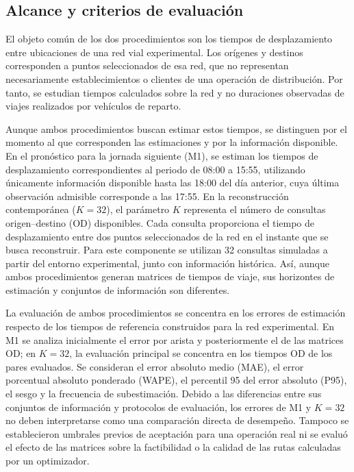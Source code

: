 \documentclass[letterpaper,11pt]{article}
\begin{document}
\subsection{Alcance y criterios de evaluación}\label{sec:alcance}

El objeto común de los dos procedimientos son los tiempos de desplazamiento entre ubicaciones de una red vial experimental. Los orígenes y destinos corresponden a puntos seleccionados de esa red, que no representan necesariamente establecimientos o clientes de una operación de distribución. Por tanto, se estudian tiempos calculados sobre la red y no duraciones observadas de viajes realizados por vehículos de reparto.

Aunque ambos procedimientos buscan estimar estos tiempos, se distinguen por el momento al que corresponden las estimaciones y por la información disponible. En el pronóstico para la jornada siguiente (M1), se estiman los tiempos de desplazamiento correspondientes al periodo de 08:00 a 15:55, utilizando únicamente información disponible hasta las 18:00 del día anterior, cuya última observación admisible corresponde a las 17:55. En la reconstrucción contemporánea ($K=32$), el parámetro $K$ representa el número de consultas origen--destino (OD) disponibles. Cada consulta proporciona el tiempo de desplazamiento entre dos puntos seleccionados de la red en el instante que se busca reconstruir. Para este componente se utilizan 32 consultas simuladas a partir del entorno experimental, junto con información histórica. Así, aunque ambos procedimientos generan matrices de tiempos de viaje, sus horizontes de estimación y conjuntos de información son diferentes.

La evaluación de ambos procedimientos se concentra en los errores de estimación respecto de los tiempos de referencia construidos para la red experimental. En M1 se analiza inicialmente el error por arista y posteriormente el de las matrices OD; en $K=32$, la evaluación principal se concentra en los tiempos OD de los pares evaluados. Se consideran el error absoluto medio (MAE), el error porcentual absoluto ponderado (WAPE), el percentil 95 del error absoluto (P95), el sesgo y la frecuencia de subestimación. Debido a las diferencias entre sus conjuntos de información y protocolos de evaluación, los errores de M1 y $K=32$ no deben interpretarse como una comparación directa de desempeño. Tampoco se establecieron umbrales previos de aceptación para una operación real ni se evaluó el efecto de las matrices sobre la factibilidad o la calidad de las rutas calculadas por un optimizador.
\end{document}
